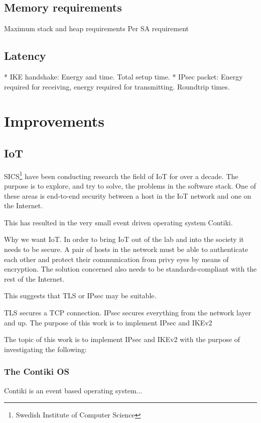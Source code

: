 \documentclass[final,letterpaper,twoside,12pt,twocolumn]{report}
\begin{document}
\section{Memory requirements}
Maximum stack and heap requirements
Per SA requirement

\section{Latency}
* IKE handshake: Energy and time. Total setup time.
* IPsec packet: Energy required for receiving, energy required for transmitting. Roundtrip times.

\chapter{Improvements}





\section{IoT}

SICS\footnote{Swedish Institute of Computer Science} have been conducting research the field of IoT for over a decade. The purpose is to explore, and try to solve, the problems in the software stack. One of these areas is end-to-end security between a host in the IoT network and one on the Internet.

 This has resulted in the very small event driven operating system Contiki. 

Why we want IoT.
In order to bring IoT out of the lab and into the society it needs to be secure. A pair of hosts in the network must be able to authenticate each other and protect their communication from privy eyes by means of encryption. The solution concerned also needs to be standards-compliant with the rest of the Internet.

This suggests that TLS or IPsec may be suitable.

TLS secures a TCP connection. IPsec secures everything from the network layer and up. The purpose of this work is to implement IPsec and IKEv2 

The topic of this work is to implement IPsec and IKEv2 with the purpose of investigating the following:


\subsection{The Contiki OS}%
Contiki is an event based operating system...
\end{document}
